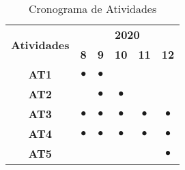 \begin{table}[h!]
    \centering
    \footnotesize
    \def \arraystretch{1.0}
    \caption{Cronograma de Atividades}
    \begin{tabular}{|c|c|c|c|c|c|}
        \hline
        \multirow{2}{*}{\bf Atividades} &  \multicolumn{5}{c|}{\bf 2020} \\ \cline{2-6} 
        & \bf 8 & \bf 9 & \bf 10 & \bf 11 & \bf 12\\  
        \hline
        \bf AT1 & $\bullet$ & $\bullet$ &  &  & \\
        \hline
        \bf AT2 &  & $\bullet$ & $\bullet$ & & \\
        \hline
        \bf AT3 & $\bullet$ & $\bullet$ & $\bullet$ & $\bullet$ & $\bullet$\\
        \hline
        \bf AT4 & $\bullet$ & $\bullet$ & $\bullet$ & $\bullet$ & $\bullet$\\
        \hline
        \bf AT5 &  &  &  &  & $\bullet$ \\
        \hline
    \end{tabular}
    \label{tabela_cronograma}
\end{table}